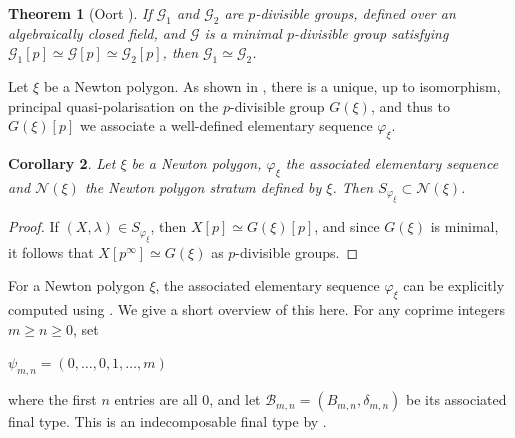 \documentclass[11pt,table]{amsart}
\newcommand{\isom}{\simeq}
\numberwithin{equation}{section}
\newtheorem{thm}{Theorem}
\newtheorem{cor}[thm]{Corollary}
\theoremstyle{definition}
\theoremstyle{remark}
\theoremstyle{remark}
\begin{document}
\begin{thm}[{\rm Oort} \cite{oort2005minimal}]
If $\mathcal{G}_{1}$ and $\mathcal{G}_{2}$ are $p$-divisible groups, defined over an algebraically closed field, and $\mathcal{G}$ is a minimal $p$-divisible group satisfying $\mathcal{G}_{1}[p] \isom \mathcal{G} [p]\isom \mathcal{G}_{2}[p]$, then $\mathcal{G}_{1} \isom \mathcal{G}_{2}$.
\end{thm}

Let $\xi$ be a Newton polygon. As shown in \cite[Proposition 3.7]{oort2004foliations}, there is a unique, up to isomorphism, principal quasi-polarisation on the $p$-divisible group $G(\xi)$, and thus to $G(\xi)[p]$ we associate a well-defined elementary sequence $\varphi_{\xi}$. 
\begin{cor} \label{minimalitycorollary}
 Let $\xi$ be a Newton polygon, $\varphi_{\xi}$ the associated elementary sequence and $\mathcal{N} (\xi)$ the Newton polygon stratum defined by $\xi$. Then $S_{\varphi_{\xi}} \subset \mathcal{N}( \xi) $.
\end{cor}
\begin{proof}
  If $ (X, \lambda) \in S_{\varphi_{\xi}}$, then $X[p] \isom G(\xi)[p]$, and since $G(\xi)$ is minimal, it follows that $X[p^{\infty}] \isom G(\xi)$ as $p$-divisible groups.  
\end{proof}
For a Newton polygon $\xi$, the associated elementary sequence $\varphi_{\xi}$ can be explicitly computed using \cite[Section 4.5]{harashita2009configuration}. We give a short overview of this here. 
For any coprime integers $m \ge n \ge0$, set
\begin{center}
$ \psi_{m,n} = (0, \ldots, 0, 1, \ldots , m )$ 
\end{center}
where the first $n$ entries are all $0$, and let $ \mathcal{B}_{m,n} = (B_{m,n}, \delta_{m,n})$ be its associated final type. This is an indecomposable final type by \cite[Corollary 4.15]{harashita2009configuration}. 
\end{document}
